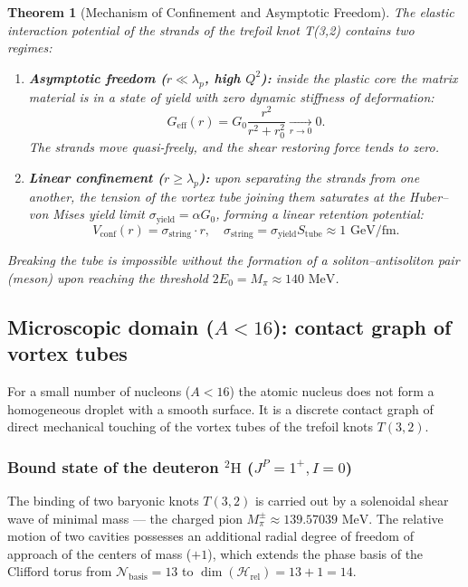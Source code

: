 \documentclass[11pt,a4paper]{article}
\newtheorem{theorem}{Theorem}
\theoremstyle{definition}
\theoremstyle{remark}
\begin{document}
\begin{theorem}[Mechanism of Confinement and Asymptotic Freedom]
\label{thm:confinement_asymptotic_freedom_nuclear}
The elastic interaction potential of the strands of the trefoil knot T(3,2) contains two regimes:
\begin{enumerate}
\item \textbf{Asymptotic freedom ($r \ll \lambda_p$, high $Q^2$):} inside the plastic core the matrix material is in a state of yield with zero dynamic stiffness of deformation:
\begin{equation}
	G_{\mathrm{eff}}(r) = G_0 \frac{r^2}{r^2 + r_0^2} \xrightarrow[r \to 0]{} 0.
\label{eq:asymptotic_freedom_core_shear}
\end{equation}
The strands move quasi-freely, and the shear restoring force tends to zero.
\item \textbf{Linear confinement ($r \ge \lambda_p$):} upon separating the strands from one another, the tension of the vortex tube joining them saturates at the Huber--von Mises yield limit $\sigma_{\mathrm{yield}} = \alpha G_0$, forming a linear retention potential:
\begin{equation}
	V_{\mathrm{conf}}(r) = \sigma_{\mathrm{string}} \cdot r, \quad \sigma_{\mathrm{string}} = \sigma_{\mathrm{yield}} S_{\mathrm{tube}} \approx 1\text{ GeV/fm}.
\label{eq:linear_confinement_string}
\end{equation}
\end{enumerate}
Breaking the tube is impossible without the formation of a soliton--antisoliton pair (meson) upon reaching the threshold $2E_0 = M_\pi \approx 140\text{ MeV}$.
\end{theorem}

\subsection{Microscopic domain ($A < 16$): contact graph of vortex tubes}

For a small number of nucleons ($A < 16$) the atomic nucleus does not form a homogeneous droplet with a smooth surface. It is a discrete contact graph of direct mechanical touching of the vortex tubes of the trefoil knots $T(3,2)$.

\subsubsection{Bound state of the deuteron $^2\mathrm{H}$ ($J^P = 1^+, I = 0$)}

The binding of two baryonic knots $T(3,2)$ is carried out by a solenoidal shear wave of minimal mass — the charged pion $M_\pi^\pm \approx 139.57039\text{ MeV}$. 
The relative motion of two cavities possesses an additional radial degree of freedom of approach of the centers of mass ($+1$), which extends the phase basis of the Clifford torus from $\mathcal{N}_{\mathrm{basis}} = 13$ to $\dim(\mathcal{H}_{\mathrm{rel}}) = 13 + 1 = 14$.
\end{document}
